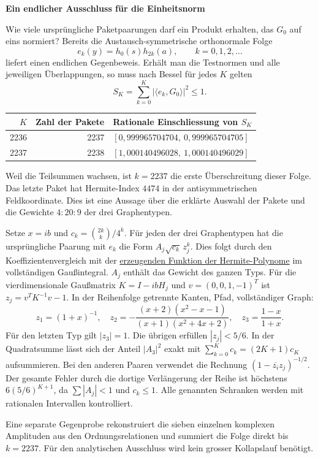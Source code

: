 \documentclass[11pt,a4paper]{article}
\newcommand{\sect}[1]{\par\vspace{4pt}{\large\bfseries\color{teal}#1}\par}
\newcommand{\titleline}[1]{{\LARGE\bfseries #1}\par\vspace{5pt}}
\begin{document}
\newpage
\titleline{Ein endlicher Ausschluss für die Einheitsnorm}
Wie viele ursprüngliche Paketpaarungen darf ein Produkt erhalten, das $G_0$ auf eins normiert? Bereits die Austausch-symmetrische orthonormale Folge
\[
 e_k(y)=h_0(s)h_{2k}(a),\qquad k=0,1,2,\ldots
\]
liefert einen endlichen Gegenbeweis. Erhält man die Testnormen und alle jeweiligen Überlappungen, so muss nach Bessel für jedes $K$ gelten
\[
 S_K=\sum_{k=0}^K|\langle e_k,G_0\rangle|^2\leq1.
\]
\begin{center}\begin{tabular}{@{}rrl@{}}\toprule
$K$ & Zahl der Pakete & Rationale Einschliessung von $S_K$\\\midrule
2236 & 2237 & $[0{,}999965704704,\ 0{,}999965704705]$\\
2237 & 2238 & $[1{,}000140496028,\ 1{,}000140496029]$\\\bottomrule\end{tabular}\end{center}
Weil die Teilsummen wachsen, ist $k=2237$ die erste Überschreitung dieser Folge. Das letzte Paket hat Hermite-Index $4474$ in der antisymmetrischen Feldkoordinate. Dies ist eine Aussage über die erklärte Auswahl der Pakete und die Gewichte $4:20:9$ der drei Graphentypen.

\sect{Wie die Grenze eingeschlossen wurde}
Setze $x=i b$ und $c_k=\binom{2k}{k}/4^k$. Für jeden der drei Graphentypen hat die ursprüngliche Paarung mit $e_k$ die Form $A_j\sqrt{c_k}\,z_j^k$. Dies folgt durch den Koeffizientenvergleich mit der \href{https://dlmf.nist.gov/18.12}{erzeugenden Funktion der Hermite-Polynome} im vollständigen Gaußintegral. $A_j$ enthält das Gewicht des ganzen Typs. Für die vierdimensionale Gaußmatrix $K=I-i b H_j$ und $v=(0,0,1,-1)^T$ ist $z_j=v^TK^{-1}v-1$. In der Reihenfolge getrennte Kanten, Pfad, vollständiger Graph:
\[
 z_1=(1+x)^{-1},\quad
 z_2=-\frac{(x+2)(x^2-x-1)}{(x+1)(x^2+4x+2)},\quad
 z_3=\frac{1-x}{1+x}.
\]
Für den letzten Typ gilt $|z_3|=1$. Die übrigen erfüllen $|z_j|<5/6$. In der Quadratsumme lässt sich der Anteil $|A_3|^2$ exakt mit $\sum_{k=0}^K c_k=(2K+1)c_K$ aufsummieren. Bei den anderen Paaren verwendet die Rechnung $(1-\overline{z_i}z_j)^{-1/2}$. Der gesamte Fehler durch die dortige Verlängerung der Reihe ist höchstens $6(5/6)^{K+1}$, da $\sum|A_j|<1$ und $c_k\leq1$. Alle genannten Schranken werden mit rationalen Intervallen kontrolliert.

Eine separate Gegenprobe rekonstruiert die sieben einzelnen komplexen Amplituden aus den Ordnungsrelationen und summiert die Folge direkt bis $k=2237$. Für den analytischen Ausschluss wird kein grosser Kollapslauf benötigt.
\end{document}
